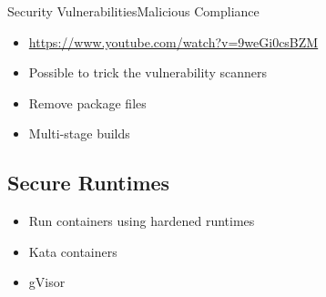 \documentclass{dcpresentation}
\begin{document}
\begin{frame}{Security Vulnerabilities}{Malicious Compliance}
 \begin{itemize}
  \item \url{https://www.youtube.com/watch?v=9weGi0csBZM}
  \item Possible to trick the vulnerability scanners
  \item Remove package files
  \item Multi-stage builds
 \end{itemize}  
\end{frame}

\subsection{Secure Runtimes}

\begin{frame}
 \begin{itemize}
  \item Run containers using hardened runtimes
  \item Kata containers
  \item gVisor
 \end{itemize}
\end{frame}
 
\end{document}
